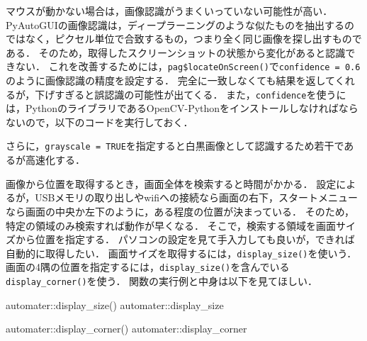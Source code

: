 \documentclass[
]{article}
\newenvironment{Shaded}{\begin{snugshade}}{\end{snugshade}}
\newcommand{\AttributeTok}[1]{\textcolor[rgb]{0.77,0.63,0.00}{#1}}
\newcommand{\ConstantTok}[1]{\textcolor[rgb]{0.00,0.00,0.00}{#1}}
\newcommand{\FloatTok}[1]{\textcolor[rgb]{0.00,0.00,0.81}{#1}}
\newcommand{\FunctionTok}[1]{\textcolor[rgb]{0.00,0.00,0.00}{#1}}
\newcommand{\NormalTok}[1]{#1}
\newcommand{\OtherTok}[1]{\textcolor[rgb]{0.56,0.35,0.01}{#1}}
\newcommand{\SpecialCharTok}[1]{\textcolor[rgb]{0.00,0.00,0.00}{#1}}
\newcommand{\StringTok}[1]{\textcolor[rgb]{0.31,0.60,0.02}{#1}}
\begin{document}
マウスが動かない場合は，画像認識がうまくいっていない可能性が高い．
PyAutoGUIの画像認識は，ディープラーニングのような似たものを抽出するのではなく，ピクセル単位で合致するもの，つまり全く同じ画像を探し出すものである．
そのため，取得したスクリーンショットの状態から変化があると認識できない．
これを改善するためには，\texttt{pag\$locateOnScreen()}で\texttt{confidence\ =\ 0.6}のように画像認識の精度を設定する．
完全に一致しなくても結果を返してくれるが，下げすぎると誤認識の可能性が出てくる．
また，\texttt{confidence}を使うには，PythonのライブラリであるOpenCV-Pythonをインストールしなければならないので，以下のコードを実行しておく．

\begin{Shaded}
\end{Shaded}

さらに，\texttt{grayscale\ =\ TRUE}を指定すると白黒画像として認識するため若干であるが高速化する．

\begin{Shaded}
\end{Shaded}

画像から位置を取得するとき，画面全体を検索すると時間がかかる．
設定によるが，USBメモリの取り出しやwifiへの接続なら画面の右下，スタートメニューなら画面の中央か左下のように，ある程度の位置が決まっている．
そのため，特定の領域のみ検索すれば動作が早くなる．
そこで，検索する領域を画面サイズから位置を指定する．
パソコンの設定を見て手入力しても良いが，できれば自動的に取得したい．
画面サイズを取得するには，\texttt{display\_size()}を使いう．
画面の4隅の位置を指定するには，\texttt{display\_size()}を含んでいる\texttt{display\_corner()}を使う．
関数の実行例と中身は以下を見てほしい．

\begin{Shaded}
\begin{Highlighting}[]
\NormalTok{automater}\SpecialCharTok{::}\FunctionTok{display\_size}\NormalTok{()}
\NormalTok{automater}\SpecialCharTok{::}\NormalTok{display\_size}

\NormalTok{automater}\SpecialCharTok{::}\FunctionTok{display\_corner}\NormalTok{()}
\NormalTok{automater}\SpecialCharTok{::}\NormalTok{display\_corner}
\end{Highlighting}
\end{Shaded}
\end{document}
